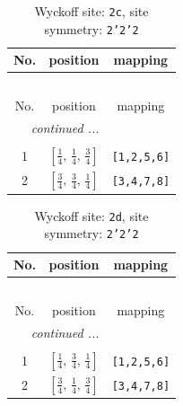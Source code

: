 \documentclass[fleqn,8pt]{jsarticle}
\begin{document}
\renewcommand{\arraystretch}{1.2}
\begin{longtable}{ccc}
\caption{Wyckoff site: {\tt 2c}, site symmetry: {\tt 2'2'2}}
 \\
 \hline \hline
No. & position & mapping \\ \hline \endfirsthead

\multicolumn{2}{l}{\tablename\ \thetable{}} \\
 \hline \hline
No. & position & mapping \\ \hline \endhead

 \hline \hline
\multicolumn{2}{r}{\footnotesize\it continued ...} \\ \endfoot

 \hline \hline
\multicolumn{2}{r}{} \\ \endlastfoot

1 & $\left[ \frac{1}{4},\, \frac{1}{4},\, \frac{3}{4} \right]$ & {\tt [1,2,5,6]} \\ \hline
2 & $\left[ \frac{3}{4},\, \frac{3}{4},\, \frac{1}{4} \right]$ & {\tt [3,4,7,8]} \\
\end{longtable}
\renewcommand{\arraystretch}{1.2}
\begin{longtable}{ccc}
\caption{Wyckoff site: {\tt 2d}, site symmetry: {\tt 2'2'2}}
 \\
 \hline \hline
No. & position & mapping \\ \hline \endfirsthead

\multicolumn{2}{l}{\tablename\ \thetable{}} \\
 \hline \hline
No. & position & mapping \\ \hline \endhead

 \hline \hline
\multicolumn{2}{r}{\footnotesize\it continued ...} \\ \endfoot

 \hline \hline
\multicolumn{2}{r}{} \\ \endlastfoot

1 & $\left[ \frac{1}{4},\, \frac{3}{4},\, \frac{1}{4} \right]$ & {\tt [1,2,5,6]} \\ \hline
2 & $\left[ \frac{3}{4},\, \frac{1}{4},\, \frac{3}{4} \right]$ & {\tt [3,4,7,8]} \\
\end{longtable}
\renewcommand{\arraystretch}{1.2}
\end{document}
